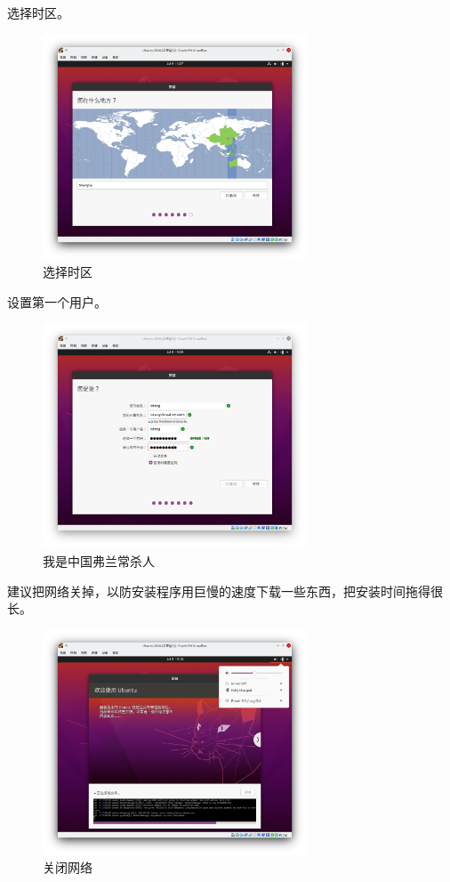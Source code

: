 \documentclass[UTF-8]{ctexart}
\begin{document}
				选择时区。
			
				\begin{figure}[H]
					\centering
					\includegraphics[width=0.7\textwidth]{fig/ubuntu_install_6.png}
					\caption*{选择时区}
				\end{figure}
			
				设置第一个用户。
				
				\begin{figure}[H]
					\centering
					\includegraphics[width=0.7\textwidth]{fig/ubuntu_install_7.png}
					\caption*{我是中国弗兰常杀人}
				\end{figure}
			
				建议把网络关掉，以防安装程序用巨慢的速度下载一些东西，把安装时间拖得很长。
			
				\begin{figure}[H]
					\centering
					\includegraphics[width=0.7\textwidth]{fig/ubuntu_install_8.png}
					\caption*{关闭网络}
				\end{figure}
			
\end{document}
